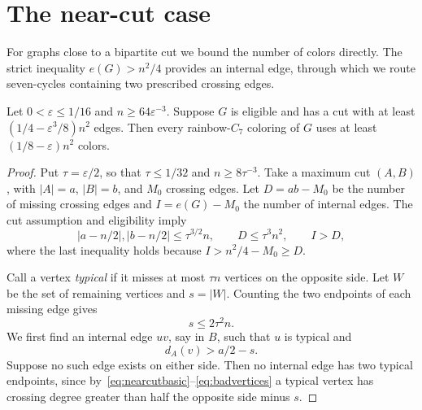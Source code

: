\section{The near-cut case}\label{sec:nearcut}
For graphs close to a bipartite cut we bound the number of colors directly. The strict inequality $e(G)>n^2/4$ provides an internal edge, through which we route seven-cycles containing two prescribed crossing edges.

\begin{lemma}\label{lem:nearcut}
Let $0<\varepsilon\le1/16$ and $n\ge64\varepsilon^{-3}$. Suppose $G$ is eligible and has a cut with at least $(1/4-\varepsilon^3/8)n^2$ edges. Then every rainbow-$C_7$ coloring of $G$ uses at least $(1/8-\varepsilon)n^2$ colors.
\end{lemma}
\begin{proof}
Put $\tau=\varepsilon/2$, so that $\tau\le1/32$ and $n\ge8\tau^{-3}$. Take a maximum cut $(A,B)$, with $|A|=a$, $|B|=b$, and $M_0$ crossing edges. Let $D=ab-M_0$ be the number of missing crossing edges and $I=e(G)-M_0$ the number of internal edges. The cut assumption and eligibility imply
\begin{equation}\label{eq:nearcutbasic}
 |a-n/2|,|b-n/2|\le\tau^{3/2}n,\qquad
 D\le\tau^3n^2,\qquad I>D,
\end{equation}
where the last inequality holds because $I>n^2/4-M_0\ge D$.

Call a vertex \emph{typical} if it misses at most $\tau n$ vertices on the opposite side. Let $W$ be the set of remaining vertices and $s=|W|$. Counting the two endpoints of each missing edge gives
\begin{equation}\label{eq:badvertices}
 s\le2\tau^2n.
\end{equation}
We first find an internal edge $uv$, say in $B$, such that $u$ is typical and
\begin{equation}\label{eq:trigger}
 d_A(v)>a/2-s.
\end{equation}
Suppose no such edge exists on either side. Then no internal edge has two typical endpoints, since by~\eqref{eq:nearcutbasic}--\eqref{eq:badvertices} a typical vertex has crossing degree greater than half the opposite side minus $s$.


\end{proof}
